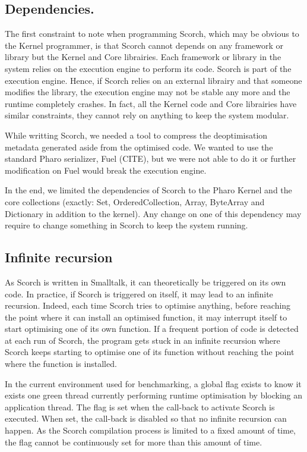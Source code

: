\documentclass[a4paper,12pt,twoside]{../includes/ThesisStyle}
\begin{document}
\subsection{Dependencies.} 

The first constraint to note when programming Scorch, which may be obvious to the Kernel programmer, is that Scorch cannot depends on any framework or library but the Kernel and Core librairies. Each framework or library in the system relies on the execution engine to perform its code. Scorch is part of the execution engine. Hence, if Scorch relies on an external librairy and that someone modifies the library, the execution engine may not be stable any more and the runtime completely crashes. In fact, all the Kernel code and Core librairies have similar constraints, they cannot rely on anything to keep the system modular. 

While writting Scorch, we needed a tool to compress the deoptimisation metadata generated aside from the optimised code. We wanted to use the standard Pharo serializer, Fuel (CITE), but we were not able to do it or further modification on Fuel would break the execution engine.

In the end, we limited the dependencies of Scorch to the Pharo Kernel and the core collections (exactly: Set, OrderedCollection, Array, ByteArray and Dictionary in addition to the kernel). Any change on one of this dependency may require to change something in Scorch to keep the system running.

\subsection{Infinite recursion}

As Scorch is written in Smalltalk, it can theoretically be triggered on its own code. In practice, if Scorch is triggered on itself, it may lead to an infinite recursion. Indeed, each time Scorch tries to optimise anything, before reaching the point where it can install an optimised function, it may interrupt itself to start optimising one of its own function. If a frequent portion of code is detected at each run of Scorch, the program gets stuck in an infinite recursion where Scorch keeps starting to optimise one of its function without reaching the point where the function is installed.

In the current environment used for benchmarking, a global flag exists to know it exists one green thread currently performing runtime optimisation by blocking an application thread. The flag is set when the call-back to activate Scorch is executed. When set, the call-back is disabled so that no infinite recursion can happen. As the Scorch compilation process is limited to a fixed amount of time, the flag cannot be continuously set for more than this amount of time.
\end{document}
